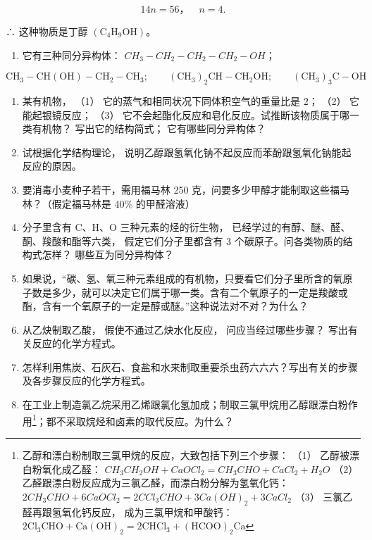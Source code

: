 \[
14 n = 56\text{，} \quad n = 4.
\]

∴ 这种物质是丁醇
\(\left(\mathrm{C}_{4}\mathrm{H}_{9}\mathrm{OH}\right)\)。

\begin{enumerate}[start=2]
\item
  它有三种同分异构体： \(CH_{3}-CH_{2}-CH_{2}-CH_{2}-OH\)；
\end{enumerate}

\[
\mathrm{CH}_{3}-\mathrm{CH}(\mathrm{OH})-\mathrm{CH}_{2}-\mathrm{CH}_{3};\qquad(\mathrm{CH}_{3})_{2}\mathrm{CH}-\mathrm{CH}_{2}\mathrm{OH};\qquad(\mathrm{CH}_{3})_{3}\mathrm{C}-\mathrm{OH}
\]

\begin{enumerate}[start=9]
\item
  某有机物， （1） 它的蒸气和相同状况下同体积空气的重量比是 2； （2）
  它能起银镜反应； （3）
  它不会起酯化反应和皂化反应。试推断该物质属于哪一类有机物？
  写出它的结构简式； 它有哪些同分异构体？
\item
  试根据化学结构理论，
  说明乙醇跟氢氧化钠不起反应而苯酚跟氢氧化钠能起反应的原因。
\item
  要消毒小麦种子若干，需用福马林 250
  克，问要多少甲醇才能制取这些福马林？（假定福马林是 40\% 的甲醛溶液）
\item
  分子里含有 C、H、O 三种元素的烃的衍生物，
  已经学过的有醇、醚、醛、酮、羧酸和酯等六类， 假定它们分子里都含有 3
  个碳原子。问各类物质的结构式怎样？ 哪些互为同分异构体？
\item
  如果说，``碳、氢、氧三种元素组成的有机物，只要看它们分子里所含的氧原子数是多少，就可以决定它们属于哪一类。含有二个氧原子的一定是羧酸或酯，含有一个氧原子的一定是醇或醚。''这种说法对不对？为什么？
\item
  从乙炔制取乙酸， 假使不通过乙炔水化反应， 问应当经过哪些步骤？
  写出有关反应的化学方程式。
\item
  怎样利用焦炭、石灰石、食盐和水来制取重要杀虫药六六六？写出有关的步骤及各步骤反应的化学方程式。
\item
  在工业上制造氯乙烷采用乙烯跟氯化氢加成；制取三氯甲烷用乙醇跟漂白粉作用\footnote{乙醇和漂白粉制取三氯甲烷的反应，大致包括下列三个步骤：
    （1） 乙醇被漂白粉氧化成乙醛：
    \(CH_{3}CH_{2}OH+CaOCl_{2}=CH_{3}CHO+CaCl_{2}+H_{2}O\) （2）
    乙醛跟漂白粉反应成为三氯乙醛，而漂白粉分解为氢氧化钙：
    \(2CH_{3}CHO+6CaOCl_{2}=2CCl_{3}CHO+3Ca(OH)_{2}+3CaCl_{2}\) （3）
    三氯乙醛再跟氢氧化钙反应， 成为三氯甲烷和甲酸钙：
    \(2\mathrm{Cl}_{3}\mathrm{CHO}+\mathrm{Ca(OH)}_{2}=2\mathrm{CHCl}_{3}+(\mathrm{HCOO})_{2}\mathrm{Ca}\)}；都不采取烷烃和卤素的取代反应。为什么？
\end{enumerate}

